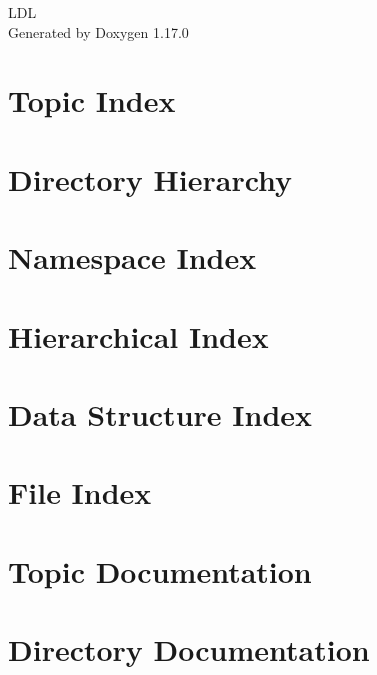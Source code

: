 \documentclass[twoside]{book}
\newcommand{\+}{\discretionary{\mbox{\scriptsize$\hookleftarrow$}}{}{}}
\newcommand{\clearemptydoublepage}{%
    \newpage{\pagestyle{empty}\cleardoublepage}%
  }
\begin{document}
  \raggedbottom
    \hypersetup{pageanchor=false,
                bookmarksnumbered=true,
                pdfencoding=unicode
               }
  \begin{titlepage}
  \vspace*{7cm}
  \begin{center}%
  {\Large LDL}\\
  \vspace*{1cm}
  {\large Generated by Doxygen 1.17.0}\\
  \end{center}
  \end{titlepage}
  \clearemptydoublepage
  \tableofcontents
  \clearemptydoublepage
  \hypersetup{pageanchor=true}
\chapter{Topic Index}

\chapter{Directory Hierarchy}

\chapter{Namespace Index}

\chapter{Hierarchical Index}

\chapter{Data Structure Index}

\chapter{File Index}

\chapter{Topic Documentation}





\chapter{Directory Documentation}





\end{document}
